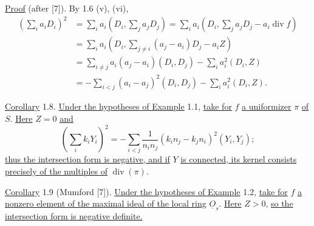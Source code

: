 \underline{Proof} (after [7]). By 1.6 (v), (vi),
\begin{equation*}
\begin{aligned}
\left(\sum_i a_iD_i\right)^2
&=\sum_i a_i\left(D_i,\sum_j a_jD_j\right)
=\sum_i a_i\left(D_i,\sum_j a_jD_j-a_i\operatorname{div}f\right)\\
&=\sum_i a_i\left(D_i,\sum_{j\ne i}(a_j-a_i)D_j-a_iZ\right)\\
&=\sum_{i\ne j}a_i(a_j-a_i)(D_i,D_j)-\sum_i a_i^2(D_i,Z)\\
&=-\sum_{i<j}(a_i-a_j)^2(D_i,D_j)-\sum_i a_i^2(D_i,Z).
\end{aligned}
\end{equation*}

\underline{Corollary} 1.8. \underline{Under the hypotheses of Example} 1.1,
\underline{take for} $f$ \underline{a uniformizer} $\pi$ \underline{of} $S$.
\underline{Here} $Z=0$ \underline{and}
\begin{equation*}
\left(\sum_i k_iY_i\right)^2
=-\sum_{i<j}\frac{1}{n_in_j}(k_in_j-k_jn_i)^2(Y_i,Y_j);
\end{equation*}
\underline{thus the intersection form is negative, and if} $Y$
\underline{is connected, its kernel consists precisely of the multiples of}
$\operatorname{div}(\pi)$.

\underline{Corollary} 1.9 (Mumford [7]). \underline{Under the hypotheses of Example}
1.2, \underline{take for} $f$ \underline{a nonzero element of the maximal ideal of
the local ring} $\underline O_s$. \underline{Here} $Z>0$, \underline{so the
intersection form is negative definite.}
